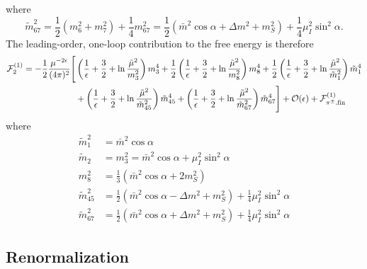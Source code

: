 %
where
%
\begin{equation}
    \tilde m_{67}^2 = \frac{1}{2}(m_6^2 + m_7^2) + \frac{1}{4} m_{67}^2
    = \frac{1}{2}(\bar m^2 \cos\alpha + \Delta m^2 + m_S^2) + \frac{1}{4} \mu_I^2\sin^2\alpha.
\end{equation}
%
The leading-order, one-loop contribution to the free energy is therefore
%
\begin{align}
    \label{one-loop free energy}
    \nonumber
    \mathcal{F}^{(1)}_2
    =
    -\frac{1}{2} \frac{  \mu^{-2\epsilon}}{(4 \pi)^2} 
    \Bigg[&
        \left(
            \frac{1}{\epsilon} + \frac{3}{2} + \ln\frac{\tilde \mu^2}{m_3^2}
        \right)
        m_3^4
        +
        \frac{1}{2}
        \left(
            \frac{1}{\epsilon} + \frac{3}{2} + \ln\frac{\tilde \mu^2}{m_8^2} 
        \right)
        m_8^4+
        \frac{1}{2}
        \left(
            \frac{1}{\epsilon} + \frac{3}{2} + \ln\frac{\tilde \mu^2}{\tilde m_1^2}
        \right)
        \tilde m_1^4 \\ \nonumber
        & +
        \left(
            \frac{1}{\epsilon} + \frac{3}{2} + \ln\frac{\tilde \mu^2}{\tilde m_{45}^2}
        \right)
        \tilde m_{45}^4
        +
        \left(
            \frac{1}{\epsilon} + \frac{3}{2} + \ln\frac{\tilde \mu^2}{\tilde m_{67}^2} 
        \right)
        \tilde m_{67}^4
    \Bigg]
    + \mathcal O(\epsilon)
    + \mathcal{F}^{(1)}_{{\pi^\pm},\text{fin}}
\end{align}
%
where
%
\begin{align}
    \tilde m_1^2 
    & =
    \bar m^2 \cos\alpha \\
    \tilde m_2 &= m_3^2 = \bar m^2 \cos\alpha + \mu_I^2 \sin^2\alpha \\
    m_8^2 & = \frac{1}{3} (\bar m^2 \cos\alpha + 2m_S^2) \\
    \tilde m_{45}^2 & 
    = \frac{1}{2}(\bar m^2 \cos \alpha - \Delta m^2 + m_S^2)
    + \frac{1}{4} \mu_I^2\sin^2\alpha \\
    \tilde m_{67}^2 & 
    = \frac{1}{2}(\bar m^2 \cos \alpha + \Delta m^2 + m_S^2)
    + \frac{1}{4} \mu_I^2\sin^2\alpha
\end{align}



\subsection{Renormalization}


